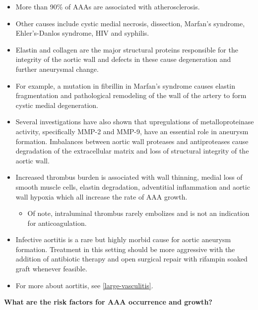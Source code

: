 \documentclass[
]{book}
\providecommand{\tightlist}{%
  \setlength{\itemsep}{0pt}\setlength{\parskip}{0pt}}
\begin{document}
\begin{itemize}
\item
  More than 90\% of AAAs are associated with atherosclerosis.
\item
  Other causes include cystic medial necrosis, dissection, Marfan's
  syndrome, Ehler's-Danlos syndrome, HIV and syphilis.
\item
  Elastin and collagen are the major structural proteins responsible
  for the integrity of the aortic wall and defects in these cause
  degeneration and further aneurysmal change.
\item
  For example, a mutation in fibrillin in Marfan's syndrome causes
  elastin fragmentation and pathological remodeling of the wall of the
  artery to form cystic medial degeneration.
\item
  Several investigations have also shown that upregulations of
  metalloproteinase activity, specifically MMP-2 and MMP-9, have an
  essential role in aneurysm formation. Imbalances between aortic wall
  proteases and antiproteases cause degradation of the extracellular
  matrix and loss of structural integrity of the aortic wall.
\item
  Increased thrombus burden is associated with wall thinning, medial
  loss of smooth muscle cells, elastin degradation, adventitial
  inflammation and aortic wall hypoxia which all increase the rate of
  AAA growth.

  \begin{itemize}
  \tightlist
  \item
    Of note, intraluminal thrombus rarely embolizes and is not an
    indication for anticoagulation.\citep{singh2019, cameron2018}
  \end{itemize}
\item
  Infective aortitis is a rare but highly morbid cause for aortic
  aneurysm formation. Treatment in this setting should be more
  aggressive with the addition of antibiotic therapy and open surgical
  repair with rifampin soaked graft whenever feasible.\citep{gornik2008, paravastu2009, rasmussen1997}
\item
  For more about aortitis, see \ref{large-vasculitis}.
\end{itemize}

\textbf{What are the risk factors for AAA occurrence and growth?}
\citep{mooreVascularEndovascularSurgery2019}
\end{document}

